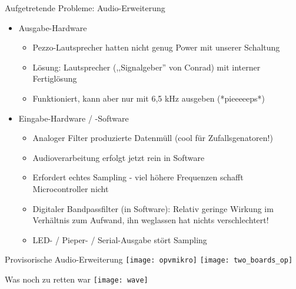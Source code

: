 \documentclass[fleqn,11pt]{beamer}
\begin{document}
\begin{frame}{Aufgetretende Probleme: Audio-Erweiterung}
	\begin{itemize}
		\item  Ausgabe-Hardware
		\begin{itemize}
			\item   Pezzo-Lautsprecher hatten nicht genug Power
			   mit unserer Schaltung
			 \item 	      Lösung: Lautsprecher
			   (,,Signalgeber'' von Conrad) mit interner Fertiglösung
			 \item  Funktioniert, kann aber nur mit
				 6,5 kHz ausgeben (*pieeeeeps*)
		\end{itemize}
		\item  Eingabe-Hardware / -Software
		\begin{itemize}
			\item   Analoger Filter produzierte Datenmüll (cool für
	       	Zufallsgenatoren!)
		   \item	        Audioverarbeitung erfolgt jetzt rein in Software
		   
			       \item	   Erfordert echtes Sampling - viel höhere Frequenzen schafft  Microcontroller nicht
	     \item   Digitaler Bandpassfilter (in Software): Relativ
		  geringe Wirkung im
		     Verhältnis zum Aufwand, ihn weglassen hat nichts
		     verschlechtert!
		     \item LED- / Pieper- / Serial-Ausgabe stört Sampling

		\end{itemize}
	\end{itemize}
\end{frame}


\begin{frame}{Provisorische Audio-Erweiterung}
	\texttt{[image: opvmikro]}
	\texttt{[image: two\_boards\_op]}
      \end{frame}

      \begin{frame}{Was noch zu retten war}
	\texttt{[image: wave]}
      \end{frame}
\end{document}
